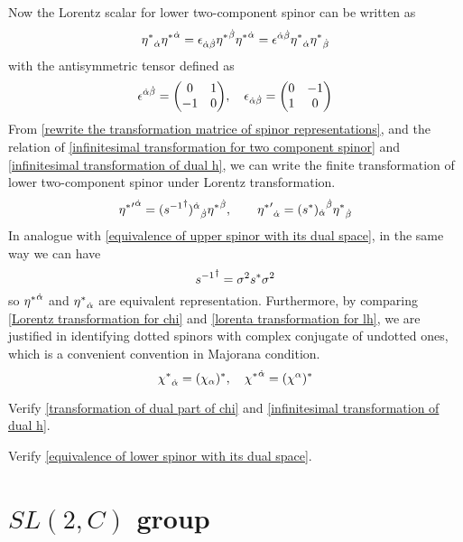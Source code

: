 Now the Lorentz scalar for lower two-component spinor can be written as
\begin{equation}
  {\eta^*}_{\dot{\alpha}}{\eta^*}^{\dot{\alpha}}
= \epsilon_{\dot{\alpha}\dot{\beta}}{\eta^*}^{\dot{\beta}}{\eta^*}^{\dot{\alpha}}
= \epsilon^{\dot{\alpha}\dot{\beta}}{\eta^*}_{\dot{\alpha}}{\eta^*}_{\dot{\beta}}
\end{equation}
with the antisymmetric tensor defined as
\begin{equation}
  \e^{\doa\dob} = \mqty(0 & 1 \\ -1 & 0),\quad
\e_{\doa\dob} =\mqty(0 & -1 \\ 1 & 0)
\end{equation}
From \eqref{rewrite the transformation matrice of spinor representations}, and the relation of \eqref{infinitesimal transformation for two component spinor} and \eqref{infinitesimal transformation of dual h}, we can write the finite transformation of lower two-component spinor under Lorentz transformation.
\begin{equation} \label{lorenta transformation for lh}
{{\eta^*}'}^{\dot{\alpha}} = {({s^{-1}}^{\dagger})^{\dot{\alpha}}}_{\dot{\beta}}{\eta^*}^{\dot{\beta}}
,\qquad
{{\eta^*}'}_{\dot{\alpha}} = {(s^{*})_{\dot{\alpha}}}^{\dot{\beta}}{\eta^*}_{\dot{\beta}}
\end{equation}
In analogue with \eqref{equivalence of upper spinor with its dual space}, in the same way we can have
\begin{equation} \label{equivalence of lower spinor with its dual space}
{s^{-1}}^{\dagger} = \sigma^2 s^* \sigma^2
\end{equation}
so ${\eta^*}^{\dot{\alpha}}$ and ${\eta^*}_{\dot{\alpha}}$ are equivalent representation.
Furthermore, by comparing \eqref{Lorentz transformation for chi} and \eqref{lorenta transformation for lh}, we are justified in identifying dotted spinors with complex conjugate of undotted ones, which is a convenient convention in Majorana condition.
\begin{equation}
  {\chi^*}_{\dot{\alpha}} = (\chi_{\alpha})^*
,\quad
{\chi^*}^{\dot{\alpha}} = (\chi^{\alpha})^*
\end{equation}

\begin{Exe}
Verify \eqref{transformation of dual part of chi} and \eqref{infinitesimal transformation of dual h}.
\end{Exe}

\begin{Exe}
Verify \eqref{equivalence of lower spinor with its dual space}.
\end{Exe}

\section{$SL(2,C)$ group}

